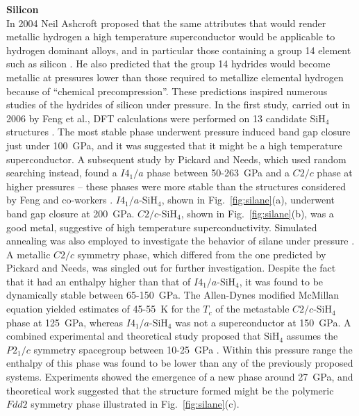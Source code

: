 \documentclass[12pt,letterpaper,oneside]{article}
\begin{document}
\noindent\textbf{Silicon} \\
%
In 2004 Neil Ashcroft proposed that the same attributes that would render metallic hydrogen a high temperature superconductor would be applicable to hydrogen dominant alloys, and in particular those containing a group 14 element such as silicon \cite{Ashcroft:2004a,Ashcroft:2004b}. He also predicted that the group 14 hydrides would become metallic at pressures lower than those required to metallize elemental hydrogen because of ``chemical precompression''. These predictions inspired numerous studies of the hydrides of silicon under pressure. In the first study, carried out in 2006 by Feng et al., DFT calculations were performed on 13 candidate SiH$_4$ structures \cite{Feng:2006a}. The most stable phase underwent pressure induced band gap closure just under 100~GPa, and it was suggested that it might be a high temperature superconductor. A subsequent study by Pickard and Needs, which used random searching instead, found a $I4_1/a$ phase between 50-263~GPa and a $C2/c$ phase at higher pressures -- these phases were more stable than the structures considered by Feng and co-workers \cite{Pickard:2006a}. $I4_1/a$-SiH$_4$, shown in Fig.\ \ref{fig:silane}(a), underwent band gap closure at 200~GPa. $C2/c$-SiH$_4$, shown in Fig.\ \ref{fig:silane}(b), was a good metal, suggestive of high temperature superconductivity. Simulated annealing was also employed to investigate the behavior of silane under pressure \cite{Yao:2007-Si}.  A metallic $C2/c$ symmetry phase, which differed from the one predicted by Pickard and Needs, was singled out for further investigation. Despite the fact that it had an enthalpy higher than that of $I4_1/a$-SiH$_4$, it was found to be dynamically stable between 65-150~GPa. The Allen-Dynes modified McMillan equation yielded estimates of 45-55~K for the $T_c$ of the metastable $C2/c$-SiH$_4$ phase at 125~GPa, whereas $I4_1/a$-SiH$_4$ was not a superconductor at 150~GPa. A combined experimental and theoretical study proposed that SiH$_4$ assumes the $P2_1/c$ symmetry spacegroup between 10-25~GPa \cite{Degtyareva:2007-Si}. Within this pressure range the enthalpy of this phase was found to be lower than any of the previously proposed systems. Experiments showed the emergence of a new phase around 27~GPa, and theoretical work suggested that the structure formed might be the polymeric $Fdd2$ symmetry phase illustrated in Fig.\ \ref{fig:silane}(c).
\end{document}
